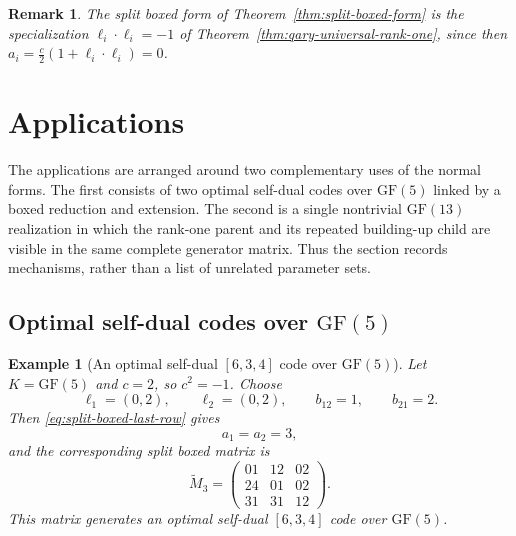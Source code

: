 \documentclass[12pt]{article}
\newtheorem{example}[theorem]{Example}
\newtheorem{remark}[theorem]{Remark}
\newcommand{\GF}[1]{\ensuremath{\mathrm{GF}(#1)}}
\begin{document}
\begin{remark}
\rm
The split boxed form of Theorem~\ref{thm:split-boxed-form} is the
specialization \(\ell_i\cdot\ell_i=-1\) of
Theorem~\ref{thm:qary-universal-rank-one}, since then
\(a_i=\frac c2(1+\ell_i\cdot\ell_i)=0\).
\end{remark}

  {}
  {}

\section{Applications}\label{sec:applications}

The applications are arranged around two complementary uses of the normal
forms.  The first consists of two optimal self-dual codes over \(\GF{5}\)
linked by a boxed reduction and extension.  The second is a single nontrivial
\(\GF{13}\) realization in which the rank-one parent and its repeated
building-up child are visible in the same complete generator matrix.  Thus
the section records mechanisms, rather than a list of unrelated parameter
sets.

\subsection{Optimal self-dual codes over \texorpdfstring{\(\GF{5}\)}{GF(5)}}

\begin{example}[An optimal self-dual \texorpdfstring{$[6,3,4]$}{[6,3,4]} code over \texorpdfstring{$\GF{5}$}{GF(5)}]
\label{ex:split-boxed-63}
\rm
Let \(K=\GF{5}\) and \(c=2\), so \(c^2=-1\). Choose
\[
\ell_1=(0,2),\qquad \ell_2=(0,2),\qquad b_{12}=1,\qquad b_{21}=2.
\]
Then \eqref{eq:split-boxed-last-row} gives
\[
a_1=a_2=3,
\]
and the corresponding split boxed matrix is
\[
\widetilde M_3=
\begin{pmatrix}
01 & 12 & 02\\
24 & 01 & 02\\
31 & 31 & 12
\end{pmatrix}.
\]
This matrix generates an optimal self-dual \([6,3,4]\) code over \(\GF{5}\).
\end{example}
\end{document}
